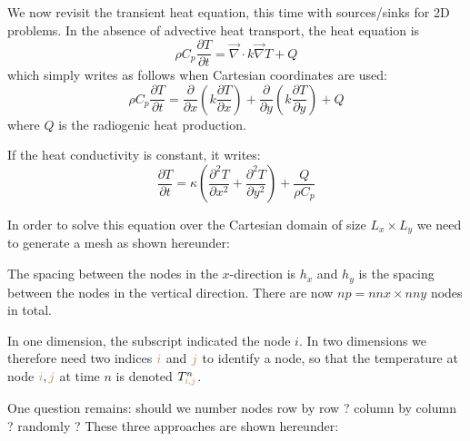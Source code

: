 We now revisit the transient heat equation, this time with sources/sinks for 2D problems.
In the absence of advective heat transport, the heat equation is 
\[
\rho C_p \frac{\partial T}{\partial t} =
\vec\nabla \cdot k \vec\nabla T + Q 
\]
which simply writes as follows when Cartesian coordinates are used:
\[
\rho C_p \frac{\partial T}{\partial t} = 
\frac{\partial }{\partial x} \left(  k  \frac{\partial T}{\partial x} \right)+
\frac{\partial }{\partial y} \left(  k  \frac{\partial T}{\partial y} \right)+
Q
\]
where $Q$ is the radiogenic heat production.

If the heat conductivity is constant, it writes:
\[
\frac{\partial T}{\partial t} =
\kappa \left(  \frac{\partial^2 T}{\partial x^2} +   \frac{\partial^2 T}{\partial y^2} \right)+
\frac{Q}{\rho C_p}
\]

In order to solve this equation over the Cartesian domain of size $L_x \times L_y$
we need to generate a mesh as shown hereunder:


\begin{minipage}[t]{\textwidth}
\begin{center}

\end{center}
\end{minipage}

The spacing between the nodes in the $x$-direction is $h_x$ and $h_y$ is the spacing
between the nodes in the vertical direction. There are now $np=nnx\times nny$ nodes in total.

In one dimension, the subscript indicated the node $i$. In two dimensions we therefore 
need two indices ${\color{brown}i}$ and ${\color{brown}j}$ 
to identify a node, so that the temperature at node ${\color{brown}i},{\color{brown}j}$ 
at time $n$ is denoted $T_{{\color{brown}i,j}}^n$.

One question remains: should we number nodes 
row by row ? column by column ? randomly ? 
These three approaches are shown hereunder: 

\vspace{.5cm}

\begin{minipage}[t]{\textwidth}
\\
\end{minipage}

\vspace{.5cm}


